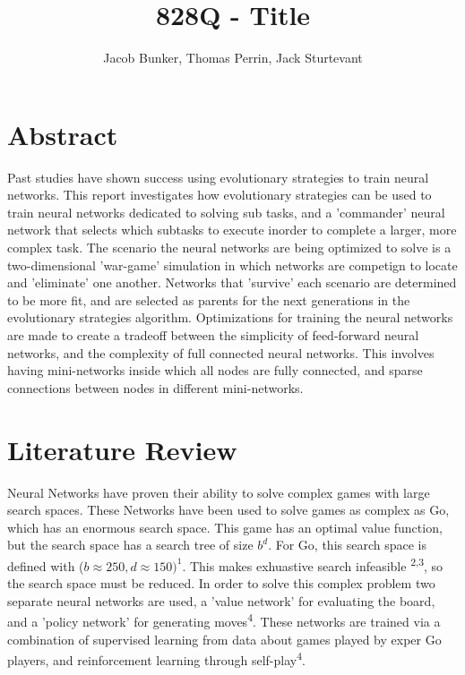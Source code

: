 \documentclass[journal]{IEEEtran}
\begin{document}
\title{828Q - Title}
\author{Jacob Bunker, Thomas Perrin, Jack Sturtevant}


\maketitle


\section{Abstract}
    Past studies have shown success using evolutionary strategies to train neural networks. This report investigates how evolutionary strategies can be used to train neural networks dedicated to solving sub tasks, and a 'commander' neural network that selects which
    subtasks to execute inorder to complete a larger, more complex task. The scenario the neural networks are being optimized to solve is a two-dimensional 'war-game' simulation in which networks are competign to locate and 'eliminate' one another. Networks that 'survive'
    each scenario are determined to be more fit, and are selected as parents for the next generations in the evolutionary strategies algorithm. Optimizations for training the neural networks are made to create a tradeoff between the simplicity of feed-forward neural
    networks, and the complexity of full connected neural networks. This involves having mini-networks inside which all nodes are fully connected, and sparse connections between nodes in different mini-networks. 

\section{Literature Review}
    Neural Networks have proven their ability to solve complex games with large search spaces. These Networks have been used to solve games as complex as Go, which has an enormous search space. This game has an optimal value function, 
    but the search space has a search tree of size $b^d$. For Go, this search space is defined with ($b \approx 250, d \approx 150)^1$. This makes exhuastive search infeasible \textsuperscript{2,3}, so the search space must be reduced. In order to solve this complex problem
    two separate neural networks are used, a 'value network' for evaluating the board, and a 'policy network' for generating moves\textsuperscript{4}. These networks are trained via a combination of supervised learning from data about games played by exper Go players,
    and reinforcement learning through self-play\textsuperscript{4}.
\end{document}

